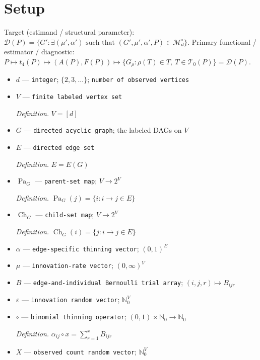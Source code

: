 \documentclass{article}
\begin{document}
\section{Setup}

Target (estimand / structural parameter): \(\mathcal D(P)=\{G':\exists(\mu',\alpha')\text{ such that }(G',\mu',\alpha',P)\in\mathcal M_d^\circ\}\).
Primary functional / estimator / diagnostic: \(P\mapsto t_4(P)\mapsto(A(P),F(P))\mapsto\{G_\rho:\rho(T)\in T,\ T\in\mathcal T_0(P)\}=\mathcal D(P)\).
\begin{itemize}
  \item \(d\) --- \texttt{integer}; \(\{2,3,\ldots\}\); \texttt{number of observed vertices}
  \item \(V\) --- \texttt{finite labeled vertex set}
  \par\smallskip\noindent\emph{Definition.} \(V=[d]\)
  \item \(G\) --- \texttt{directed acyclic graph}; the labeled DAGs on \(V\)
  \item \(E\) --- \texttt{directed edge set}
  \par\smallskip\noindent\emph{Definition.} \(E=E(G)\)
  \item \(\operatorname{Pa}_G\) --- \texttt{parent-\allowbreak{}set map}; \(V\to 2^V\)
  \par\smallskip\noindent\emph{Definition.} \(\operatorname{Pa}_G(j)=\{i:i\to j\in E\}\)
  \item \(\operatorname{Ch}_G\) --- \texttt{child-\allowbreak{}set map}; \(V\to 2^V\)
  \par\smallskip\noindent\emph{Definition.} \(\operatorname{Ch}_G(i)=\{j:i\to j\in E\}\)
  \item \(\alpha\) --- \texttt{edge-\allowbreak{}specific thinning vector}; \((0,1)^E\)
  \item \(\mu\) --- \texttt{innovation-\allowbreak{}rate vector}; \((0,\infty)^V\)
  \item \(B\) --- \texttt{edge-\allowbreak{}and-\allowbreak{}individual Bernoulli trial array}; \((i,j,r)\mapsto B_{ijr}\)
  \item \(\varepsilon\) --- \texttt{innovation random vector}; \(\mathbb N_0^V\)
  \item \(\circ\) --- \texttt{binomial thinning operator}; \((0,1)\times\mathbb N_0\to\mathbb N_0\)
  \par\smallskip\noindent\emph{Definition.} \(\alpha_{ij}\circ x=\sum_{r=1}^{x}B_{ijr}\)
  \item \(X\) --- \texttt{observed count random vector}; \(\mathbb N_0^V\)

\end{itemize}
\end{document}
